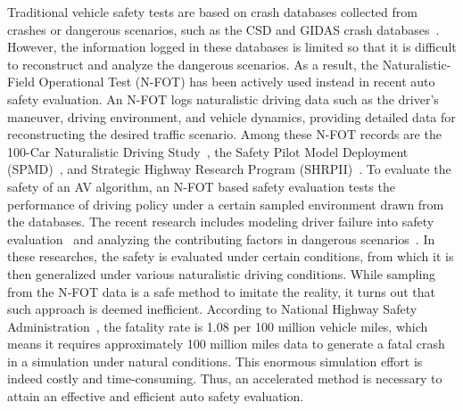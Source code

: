 \documentclass[letterpaper, 10 pt, journal]{IEEEtran}  %
\newcommand{\mansur}[1]{\textcolor{blue}{[Mansur: #1]}}
\begin{document}
Traditional vehicle safety tests are based on crash databases collected from crashes or dangerous scenarios, such as the CSD and GIDAS crash databases~\cite{zhao2017trafficnet}. However, the information logged in these databases is limited so that it is difficult to reconstruct and analyze the dangerous scenarios. As a result, the Naturalistic-Field Operational Test (N-FOT) has been actively used instead in recent auto safety evaluation. An N-FOT logs naturalistic driving data such as the driver’s maneuver, driving environment, and vehicle dynamics, providing detailed data for reconstructing the desired traffic scenario. Among these N-FOT records are the 100-Car Naturalistic Driving Study~\cite{neale2005overview}, the Safety Pilot Model Deployment (SPMD)~\cite{spmd}, and Strategic Highway Research Program (SHRPII)~\cite{punzo2011assessment}. To evaluate the safety of an AV algorithm, an N-FOT based safety evaluation tests the performance of driving policy under a certain sampled environment drawn from the databases. The recent research includes modeling driver failure into safety evaluation~\cite{Chai2017156,kovaceva2015contributing} and analyzing the contributing factors in dangerous scenarios~\cite{dingus2016driver,bella2014analysis,qu2014safety}. In these researches, the safety is evaluated under certain conditions, from which it is then generalized under various naturalistic driving conditions. While sampling from the N-FOT data is a safe method to imitate the reality, it turns out that such approach is deemed inefficient. According to National Highway Safety Administration~\cite{facts2014data}, the fatality rate is 1.08 per 100 million vehicle miles, which means it requires approximately 100 million miles data to generate a fatal crash in a simulation under natural conditions. This enormous simulation effort is indeed costly and time-consuming. Thus, an accelerated method is necessary to attain an effective and efficient auto safety evaluation.



\end{document}
